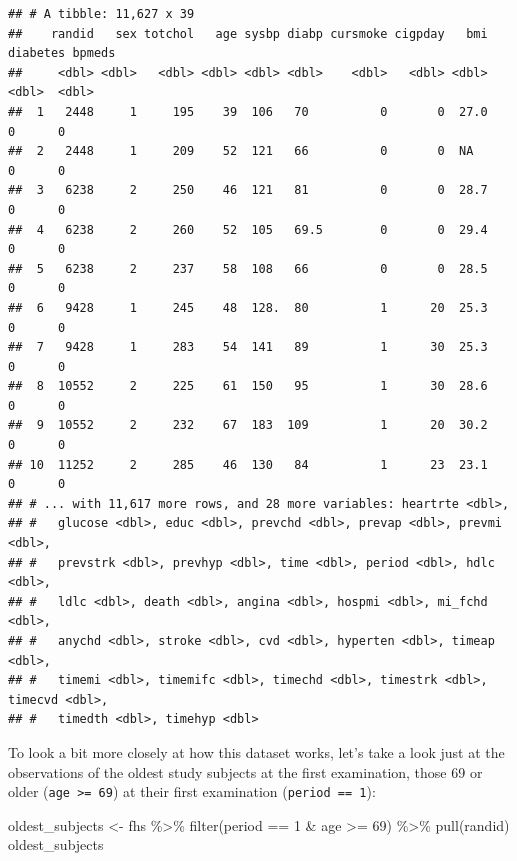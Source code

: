 \documentclass[
]{book}
\newenvironment{Shaded}{\begin{snugshade}}{\end{snugshade}}
\newcommand{\DecValTok}[1]{\textcolor[rgb]{0.00,0.00,0.81}{#1}}
\newcommand{\FunctionTok}[1]{\textcolor[rgb]{0.00,0.00,0.00}{#1}}
\newcommand{\NormalTok}[1]{#1}
\newcommand{\OtherTok}[1]{\textcolor[rgb]{0.56,0.35,0.01}{#1}}
\newcommand{\SpecialCharTok}[1]{\textcolor[rgb]{0.00,0.00,0.00}{#1}}
\begin{document}
\begin{verbatim}
## # A tibble: 11,627 x 39
##    randid   sex totchol   age sysbp diabp cursmoke cigpday   bmi diabetes bpmeds
##     <dbl> <dbl>   <dbl> <dbl> <dbl> <dbl>    <dbl>   <dbl> <dbl>    <dbl>  <dbl>
##  1   2448     1     195    39  106   70          0       0  27.0        0      0
##  2   2448     1     209    52  121   66          0       0  NA          0      0
##  3   6238     2     250    46  121   81          0       0  28.7        0      0
##  4   6238     2     260    52  105   69.5        0       0  29.4        0      0
##  5   6238     2     237    58  108   66          0       0  28.5        0      0
##  6   9428     1     245    48  128.  80          1      20  25.3        0      0
##  7   9428     1     283    54  141   89          1      30  25.3        0      0
##  8  10552     2     225    61  150   95          1      30  28.6        0      0
##  9  10552     2     232    67  183  109          1      20  30.2        0      0
## 10  11252     2     285    46  130   84          1      23  23.1        0      0
## # ... with 11,617 more rows, and 28 more variables: heartrte <dbl>,
## #   glucose <dbl>, educ <dbl>, prevchd <dbl>, prevap <dbl>, prevmi <dbl>,
## #   prevstrk <dbl>, prevhyp <dbl>, time <dbl>, period <dbl>, hdlc <dbl>,
## #   ldlc <dbl>, death <dbl>, angina <dbl>, hospmi <dbl>, mi_fchd <dbl>,
## #   anychd <dbl>, stroke <dbl>, cvd <dbl>, hyperten <dbl>, timeap <dbl>,
## #   timemi <dbl>, timemifc <dbl>, timechd <dbl>, timestrk <dbl>, timecvd <dbl>,
## #   timedth <dbl>, timehyp <dbl>
\end{verbatim}

To look a bit more closely at how this dataset works, let's take a look just at the observations of the oldest study subjects at the first examination, those 69 or older (\texttt{age\ \textgreater{}=\ 69}) at their first examination (\texttt{period\ ==\ 1}):

\begin{Shaded}
\begin{Highlighting}[]
\NormalTok{oldest\_subjects }\OtherTok{\textless{}{-}}\NormalTok{ fhs }\SpecialCharTok{\%\textgreater{}\%} 
  \FunctionTok{filter}\NormalTok{(period }\SpecialCharTok{==} \DecValTok{1} \SpecialCharTok{\&}\NormalTok{ age }\SpecialCharTok{\textgreater{}=} \DecValTok{69}\NormalTok{) }\SpecialCharTok{\%\textgreater{}\%} 
  \FunctionTok{pull}\NormalTok{(randid)}
\NormalTok{oldest\_subjects}
\end{Highlighting}
\end{Shaded}
\end{document}
